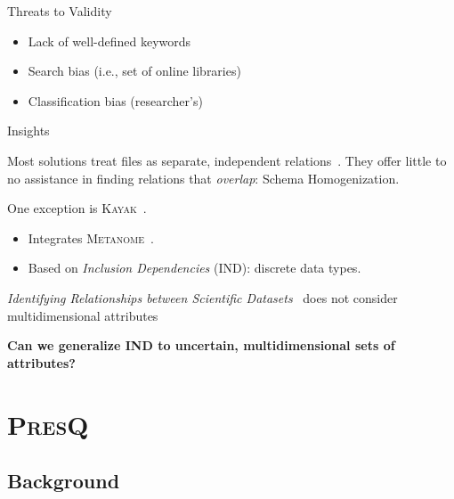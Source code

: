 \documentclass[10pt,notes]{beamer}
\newcommand{\PresQ}[0]{\textsc{PresQ}\xspace}
\begin{document}
\begin{frame}{Threats to Validity}
\begin{itemize}
    \item Lack of well-defined keywords
    \item Search bias (i.e., set of online libraries)
    \item Classification bias (researcher's)
\end{itemize}
\end{frame}

\begin{frame}{Insights}
    \begin{block}{}
        Most solutions treat files as separate, independent relations~\cite{Silva2016}. They offer
        little to no assistance in finding relations that \textit{overlap}: \alert{Schema Homogenization}.
    \end{block}
    \begin{block}{}
        One exception is \textsc{Kayak}~\cite{maccioni_crossing_2017}.
        \begin{itemize}
            \item Integrates \textsc{Metanome}~\cite{papenbrock2015data}.
            \item Based on \emph{Inclusion Dependencies} (IND): discrete data types.
        \end{itemize}
    \end{block}
    \begin{block}{}
        \emph{Identifying Relationships between Scientific Datasets}~\cite{alawini2016} does not
        consider multidimensional attributes
    \end{block}
    \alert{\textbf{Can we generalize IND to uncertain, multidimensional sets of attributes?}}
\end{frame}

\section{\PresQ}

\subsection{Background}
\end{document}
